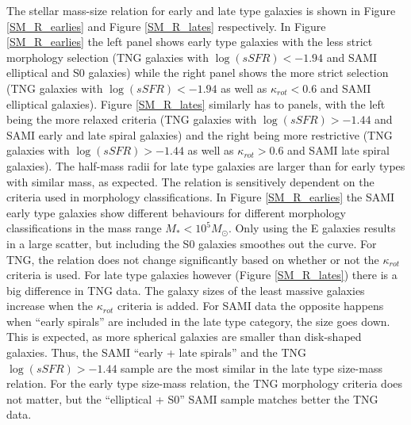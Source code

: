The stellar mass-size relation for early and late type galaxies is shown in Figure \ref{SM_R_earlies} and Figure \ref{SM_R_lates} respectively. In Figure \ref{SM_R_earlies} the left panel shows early type galaxies with the less strict morphology selection (TNG galaxies with $\log(sSFR) < -1.94$ and SAMI elliptical and S0 galaxies) while the right panel shows the more strict selection (TNG galaxies with $\log(sSFR) < -1.94$ as well as $\kappa_{rot} < 0.6$ and SAMI elliptical galaxies). Figure \ref{SM_R_lates} similarly has to panels, with the left being the more relaxed criteria (TNG galaxies with $\log(sSFR) > -1.44$ and SAMI early and late spiral galaxies) and the right being more restrictive (TNG galaxies with $\log(sSFR) > -1.44$ as well as $\kappa_{rot} > 0.6$ and SAMI late spiral galaxies).
The half-mass radii for late type galaxies are larger than for early types with similar mass, as expected. The relation is sensitively dependent on the criteria used in morphology classifications. In Figure \ref{SM_R_earlies} the SAMI early type galaxies show different behaviours for different morphology classifications in the mass range $M_\ast < 10^5 M_\odot$. Only using the E galaxies results in a large scatter, but including the S0 galaxies smoothes out the curve. For TNG, the relation does not change significantly based on whether or not the $\kappa_{rot}$ criteria is used. 
For late type galaxies however (Figure \ref{SM_R_lates}) there is a big difference in TNG data. The galaxy sizes of the least massive galaxies increase when the $\kappa_{rot}$ criteria is added. For SAMI data the opposite happens when ``early spirals'' are included in the late type category, the size goes down. This is expected, as more spherical galaxies are smaller than disk-shaped galaxies. Thus, the SAMI ``early + late spirals'' and the TNG $\log(sSFR) > -1.44$ sample are the most similar in the late type size-mass relation. For the early type size-mass relation, the TNG morphology criteria does not matter, but the ``elliptical + S0'' SAMI sample matches better the TNG data.


